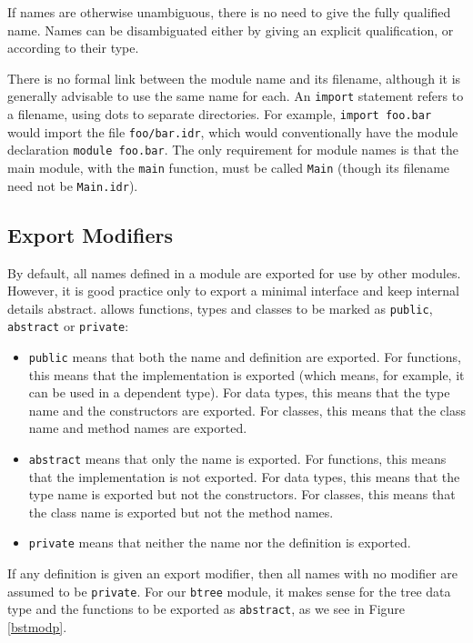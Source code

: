 \noindent
If names are otherwise unambiguous, there is no need to give the fully qualified name.
Names can be disambiguated either by giving an explicit qualification, or according to
their type.

There is no formal link between the module name and its filename, although it
is generally advisable to use the same name for each. An \texttt{import}
statement refers to a filename, using dots to separate directories. For
example, \texttt{import foo.bar} would import the file \texttt{foo/bar.idr},
which would conventionally have the module declaration \texttt{module foo.bar}.
The only requirement for module names is that the main module, with the
\texttt{main} function, must be called \texttt{Main} (though its filename need
not be \texttt{Main.idr}).

\subsection{Export Modifiers}

By default, all names defined in a module are exported for use by other modules.
However, it is good practice only to export a minimal interface and keep internal
details abstract. \Idris{} allows functions, types and classes to be marked
as \texttt{public}, \texttt{abstract} or \texttt{private}:

\begin{itemize}
\item \texttt{public} means that both the name and definition are exported.
For functions, this means that the implementation is exported (which means, for example,
it can be used in a dependent type). For data types, this means that the type name and
the constructors are exported. For classes, this means that the class name and
method names are exported.
\item \texttt{abstract} means that only the name is exported. For functions, this means
that the implementation is not exported. For data types, this means that the type name
is exported but not the constructors. For classes, this means that the class name is exported
but not the method names.
\item \texttt{private} means that neither the name nor the definition is exported.
\end{itemize}

\noindent
If any definition is given an export modifier, then all names with no modifier are assumed
to be \texttt{private}. For our \texttt{btree} module, it makes sense for the
tree data type and the functions to be exported as \texttt{abstract}, as we see in
Figure \ref{bstmodp}.

